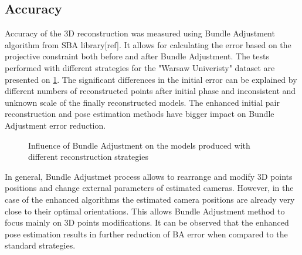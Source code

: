 \subsection{Accuracy}
Accuracy of the 3D reconstruction was measured using Bundle Adjustment algorithm from SBA library[ref]. It allows for calculating the error based on the projective constraint both before and after Bundle Adjustment.
The tests performed with different strategies  for the "Warsaw Univeristy" dataset are presented on \ref{plot:BAError}. The significant differences in the initial error can be explained by different numbers of reconstructed points after initial phase and inconsistent and unknown scale of the finally reconstructed models. The enhanced initial pair reconstruction and pose estimation methods have bigger impact on Bundle Adjustment error reduction.
\begin{figure}[ht!]
  \begin{center}
    \caption{Influence of Bundle Adjustment on the models produced with different reconstruction strategies }
    \label{plot:BAError}
  \end{center}
\end{figure}
\clearpage
In general, Bundle Adjustmet process allows to rearrange and modify 3D points positions and change external parameters of estimated cameras. However, in the case of the enhanced algorithms the estimated camera positions are already very close to their optimal orientations. This allows Bundle Adjustment method to focus mainly on 3D points modifications. It can be observed that the enhanced pose estimation results in further reduction of BA error when compared to the standard strategies. 

